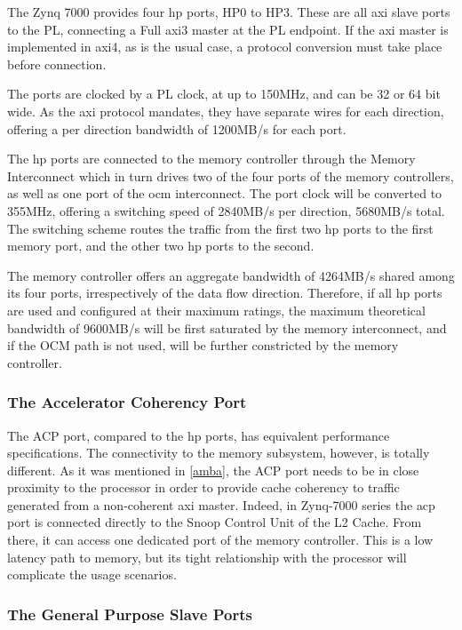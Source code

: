 The Zynq 7000 provides four \gls{hp} ports, HP0 to HP3.
These are all \gls{axi} slave ports to the PL,
connecting a Full \gls{axi}3 master at the PL endpoint. 
If the \gls{axi} master is implemented in \gls{axi}4, as is the usual case,
a protocol conversion must take place before connection.

The ports are clocked by a PL clock, at up to 150MHz, and can be 32 or 64 bit wide.
As the \gls{axi} protocol mandates, they have separate wires for each direction,
offering a per direction bandwidth of 1200MB/s for each port.

The \gls{hp} ports are connected to the memory controller through the Memory Interconnect
which in turn drives two of the four ports of the memory controllers, as well as
one port of the \gls{ocm} interconnect.
The port clock will be converted to 355MHz,
offering a switching speed of 2840MB/s per direction, 5680MB/s total.
The switching scheme routes the traffic from the first two \gls{hp} ports 
to the first memory port, and the other two \gls{hp} ports to the second. 

The memory controller offers an aggregate bandwidth of 4264MB/s 
shared among its four ports, irrespectively of the data flow direction.
Therefore, if all \gls{hp} ports are used and configured at their maximum ratings,
the maximum theoretical bandwidth of 9600MB/s will be first saturated by the
memory interconnect, and if the OCM path is not used, will be further constricted
by the memory controller.

\subsubsection{The Accelerator Coherency Port}

The ACP port, compared to the \gls{hp} ports, 
has equivalent performance specifications.
The connectivity to the memory subsystem, 
however, is totally different.
As it was mentioned in \ref{amba}, 
the ACP port needs to be in close proximity to the
processor in order to provide cache coherency 
to traffic generated from a non-coherent \gls{axi} master.
Indeed, in Zynq-7000 series the \gls{acp} port is connected 
directly to the Snoop Control Unit of the L2 Cache. 
From there, it can access one dedicated 
port of the memory controller.
This is a low latency path to memory, 
but its tight relationship with the processor
will complicate the usage scenarios.

\subsubsection{The General Purpose Slave Ports}
\label{sect:sgp}

